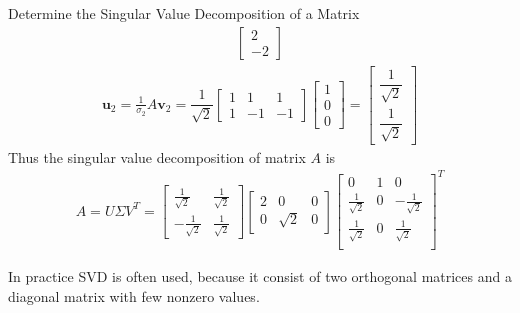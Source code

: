 \begin{example}{Determine the Singular Value Decomposition of a Matrix}
\begin{align*}
    \begin{bmatrix}
       2\\
       -2
    \end{bmatrix}
\end{align*} 
\begin{align*}
    \mathbf{u}_2 = \frac{1}{\sigma_2}A \mathbf{v}_2 = \dfrac{1}{\sqrt{2}}
    \begin{bmatrix}
       1 & 1 & 1\\
       1 & -1 & -1
    \end{bmatrix}
    \begin{bmatrix}
       1\\0\\0
    \end{bmatrix}
    = 
    \begin{bmatrix}
       \dfrac{1}{\sqrt{2}} \\
       \dfrac{1}{\sqrt{2}}
    \end{bmatrix}
\end{align*}  
Thus the singular value decomposition of matrix $A$ is 
\begin{align*}
    A = U\Sigma V^T = 
    \begin{bmatrix}
        \frac{1}{\sqrt{2}}&\frac{1}{\sqrt{2}}\\
        -\frac{1}{\sqrt{2}}& \frac{1}{\sqrt{2}}
    \end{bmatrix}
    \begin{bmatrix}
       2 & 0 & 0\\
       0 & \sqrt{2} & 0
    \end{bmatrix}
    \begin{bmatrix}
       0 & 1 & 0\\
       \frac{1}{\sqrt{2}} & 0 & -\frac{1}{\sqrt{2}}\\
       \frac{1}{\sqrt{2}} & 0 & \frac{1}{\sqrt{2}}\\
    \end{bmatrix}^T
\end{align*}
\end{example}

In practice SVD is often used, because it consist of two orthogonal matrices and a diagonal matrix with few nonzero values. 
